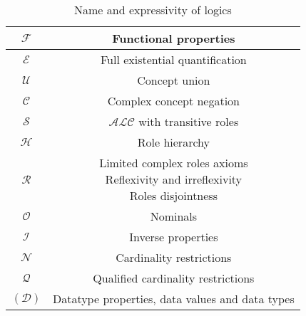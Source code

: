 \begin{table}[h]
    \centering
    \begin{tabular}{|c|c|}
        \hline
        $\mathcal{F}$ & Functional properties \\ \hline
        $\mathcal{E}$ & Full existential quantification \\ \hline
        $\mathcal{U}$ & Concept union \\ \hline
        $\mathcal{C}$ & Complex concept negation \\ \hline
        $\mathcal{S}$ & $\mathcal{ALC}$ with transitive roles \\ \hline
        $\mathcal{H}$ & Role hierarchy \\ \hline
        $\mathcal{R}$ & \makecell[c]{Limited complex roles axioms\\Reflexivity and irreflexivity\\Roles disjointness} \\ \hline
        $\mathcal{O}$ & Nominals \\ \hline
        $\mathcal{I}$ & Inverse properties \\ \hline
        $\mathcal{N}$ & Cardinality restrictions \\ \hline
        $\mathcal{Q}$ & Qualified cardinality restrictions \\ \hline
        $\mathcal{(D)}$ & Datatype properties, data values and data types \\ \hline
    \end{tabular}
    \caption{Name and expressivity of logics}
\end{table}